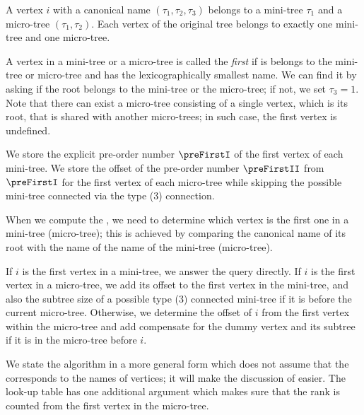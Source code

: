 A vertex $i$ with a canonical name $(\tau_1, \tau_2, \tau_3)$ belongs to a mini-tree $\tau_1$ and a micro-tree $(\tau_1, \tau_2)$.
Each vertex of the original tree belongs to exactly one mini-tree and one micro-tree.

A vertex in a mini-tree or a micro-tree is called the \emph{first} if is belongs to the mini-tree or micro-tree and has the lexicographically smallest name.
We can find it by asking if the root belongs to the mini-tree or the micro-tree; if not, we set $\tau_3 = 1$.
Note that there can exist a micro-tree consisting of a single vertex, which is its root, that is shared with another micro-trees; in such case, the first vertex is undefined.

\bigbreak

We store the explicit pre-order number $\preFirstI$ of the first vertex of each mini-tree.
We store the offset of the pre-order number $\preFirstII$ from $\preFirstI$ for the first vertex of each micro-tree while skipping the possible mini-tree connected via the type (3) connection.

When we compute the \preRank{}, we need to determine which vertex is the first one in a mini-tree (micro-tree); this is achieved by comparing the canonical name of  its root with the name of the name of the mini-tree (micro-tree).

If $i$ is the first vertex in a mini-tree, we answer the query directly.
If $i$ is the first vertex in a micro-tree, we add its offset to the first vertex in the mini-tree, and also the subtree size of a possible type (3) connected mini-tree if it is before the current micro-tree.
Otherwise, we determine the offset of $i$ from the first vertex within the micro-tree and add compensate for the dummy vertex and its subtree if it is in the micro-tree before $i$.

We state the algorithm in a more general form which does not assume that the \preRank{} corresponds to the names of vertices; it will make the discussion of \postRank{} easier.
The look-up table \preRank{} has one additional argument which makes sure that the rank is counted from the first vertex in the micro-tree.

